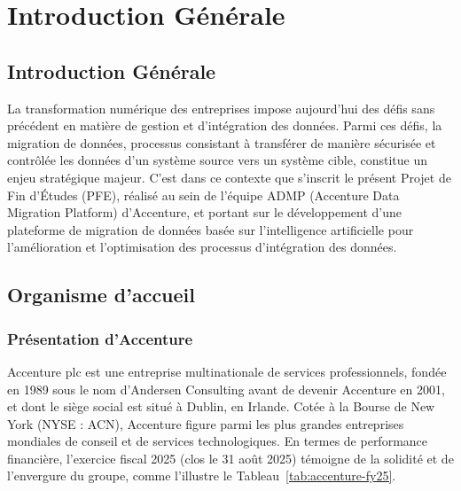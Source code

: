 %
\chapter{Introduction Générale}
\section{Introduction Générale}
\label{chap:introduction}

La transformation numérique des entreprises impose aujourd'hui des défis sans précédent en matière de gestion et d'intégration des données. Parmi ces défis, la migration de données, processus consistant à transférer de manière sécurisée et contrôlée les données d'un système source vers un système cible, constitue un enjeu stratégique majeur. C'est dans ce contexte que s'inscrit le présent Projet de Fin d'Études (PFE), réalisé au sein de l'équipe ADMP (Accenture Data Migration Platform) d'Accenture, et portant sur le développement d'une plateforme de migration de données basée sur l'intelligence artificielle pour l'amélioration et l'optimisation des processus d'intégration des données.

\section{Organisme d'accueil}
\label{sec:organisme}



\subsection{Présentation d'Accenture}
\label{subsec:accenture}

Accenture plc est une entreprise multinationale de services professionnels, fondée en 1989 sous le nom d'Andersen Consulting avant de devenir Accenture en 2001, et dont le siège social est situé à Dublin, en Irlande. Cotée à la Bourse de New York (NYSE : ACN), Accenture figure parmi les plus grandes entreprises mondiales de conseil et de services technologiques.
En termes de performance financière, l'exercice fiscal 2025 (clos le 31 août 2025) témoigne de la solidité et de l'envergure du groupe, comme l'illustre le Tableau~\ref{tab:accenture-fy25}.

